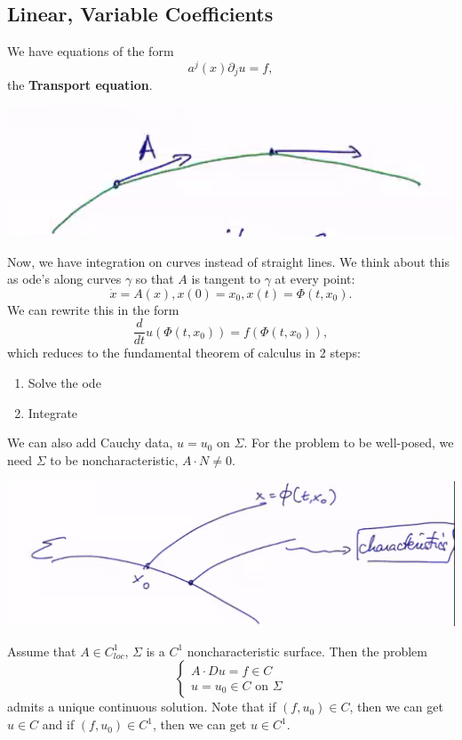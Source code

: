 \documentclass[12pt]{scrartcl}
\begin{document}
\subsection{Linear, Variable Coefficients}
We have equations of the form
$$a^j(x)\partial_j u = f,$$
the \textbf{Transport equation}. 
 \begin{center}
\includegraphics[scale=0.5]{curve.png}
\end{center}
Now, we have integration on curves instead of straight lines.  We think about this as ode's along curves $\gamma$ so that $A$ is tangent to $\gamma$ at every point: 
$$\dot{x} = A(x), x(0) = x_0, x(t) = \Phi(t, x_0).$$
We can rewrite this in the form
$$\frac{d}{dt} u(\Phi(t, x_0)) = f(\Phi(t, x_0)),$$
which reduces to the fundamental theorem of calculus in 2 steps:
\begin{enumerate}
\item Solve the ode
\item Integrate
\end{enumerate}
We can also add Cauchy data, $u = u_0$ on $\Sigma$.  For the problem to be well-posed, we need $\Sigma$ to be noncharacteristic, $A \cdot N \ne 0$.
 \begin{center}
\includegraphics[scale=0.5]{char.png}
\end{center}
\begin{thm} Assume that $A \in C_{loc}^1$, $\Sigma$ is a $C^1$ noncharacteristic surface.  Then the problem
$$\begin{cases}
A \cdot Du = f  \in C\\
u = u_0 \in C \text{ on } \Sigma
\end{cases}$$
admits a unique continuous solution.
Note that if $(f, u_0) \in C$, then we can get $u \in C$ and if $(f,u_0) \in C^1$, then we can get $u \in C^1$.
\end{thm}
\end{document}
